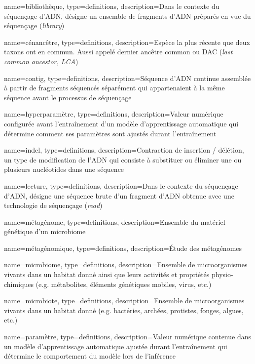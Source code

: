  {
  name={bibliothèque},
  type=definitions,
  description={Dans le contexte du séquençage d'ADN, désigne un ensemble de fragments
  d'ADN préparés en vue du séquençage (\textit{library})}
}

 {
  name={cénancêtre},
  type=definitions,
  description={Espèce la plus récente que deux taxons ont en commun. Aussi appelé dernier
  ancêtre common ou DAC (\textit{last common ancestor, LCA})}
}

 {
  name={contig},
  type=definitions,
  description={Séquence d'ADN continue assemblée à partir de fragments séquencés séparément qui appartenaient à la même séquence avant le processus de séquençage}
}

 {
  name={hyperparamètre},
  type=definitions,
  description={Valeur numérique configurée avant l'entraînement d'un modèle d'apprentissage automatique qui détermine comment ses paramètres sont ajustés durant l'entraînement}
}

 {
  name={indel},
  type=definitions,
  description={Contraction de insertion / délétion, un type de modification de l'ADN qui consiste à substituer ou éliminer une ou plusieurs nucléotides dans une séquence}
}

 {
  name={lecture},
  type=definitions,
  description={Dans le contexte du séquençage d'ADN, désigne une séquence brute
      d'un fragment d'ADN obtenue avec une technologie de séquençage (\textit{read})}
}

 {
  name={métagénome},
  type=definitions,
  description={Ensemble du matériel génétique d'un microbiome \cite{roy2024}}
}

 {
  name={métagénomique},
  type=definitions,
  description={Étude des métagénomes \cite{roy2024}}
}

 {
  name={microbiome},
  type=definitions,
  description={Ensemble de microorganismes vivants dans un habitat donné ainsi que leurs activités et propriétés physio-chimiques (e.g. métabolites, éléments génétiques mobiles, virus, etc.) \cite{Berg2020}}
}

 {
  name={microbiote},
  type=definitions,
  description={Ensemble de microorganismes vivants dans un habitat donné (e.g. bactéries, archées, protistes, fonges, algues, etc.) \cite{Berg2020}}
}

 {
  name={paramètre},
  type=definitions,
  description={Valeur numérique contenue dans un modèle d'apprentissage automatique ajustée durant l'entraînement qui détermine le comportement du modèle lors de l'inférence}
}
